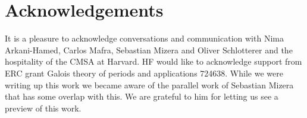 \documentclass[11pt]{article}
\newcommand{\1}{{\rm 1\hskip-0.25em I}}
\begin{document}
\section{Acknowledgements}
It is a pleasure to acknowledge conversations and communication with Nima Arkani-Hamed, Carlos Mafra, Sebastian Mizera and Oliver Schlotterer and the hospitality of the CMSA at Harvard. HF would like to acknowledge support from ERC grant Galois theory of periods and applications 724638.  While we were writing up this work we became aware of the parallel work of Sebastian Mizera \cite{Mizera:2019n} that has some overlap with this.  We are grateful to him for letting us see a preview of this work.

  

\end{document}
